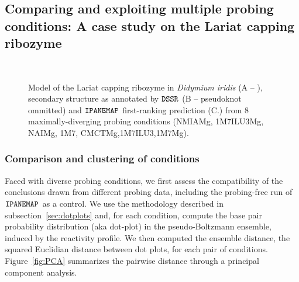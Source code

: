 \documentclass[a4,center,fleqn]{NAR}
\newcommand{\Software}[1]{$\text{\ttfamily #1}$}
\newcommand{\OurTool}{\Software{IPANEMAP}\xspace}
\begin{document}


\subsection{Comparing and exploiting multiple probing conditions: A case study on the Lariat capping ribozyme}

\begin{figure}
	{\\}
	
	\caption{Model of the Lariat capping ribozyme in {\itshape Didymium iridis} (A -- \citet{Meyer2014}), secondary structure as annotated by \Software{DSSR} (B -- pseudoknot ommitted) and \OurTool first-ranking prediction (C.) from 8 maximally-diverging probing conditions (NMIAMg, 1M7ILU3Mg, NAIMg, 1M7, CMCTMg,1M7ILU3,1M7Mg). }
\end{figure}



\subsubsection{Comparison and clustering of conditions}
Faced with diverse probing conditions, we first assess the compatibility of the conclusions drawn from different probing data, including the probing-free run of \OurTool as a control. We use the methodology described in subsection~\ref{sec:dotplots} and, for each condition, compute the base pair probability distribution (aka dot-plot) in the  pseudo-Boltzmann ensemble, induced by the reactivity profile. We then computed the ensemble distance, the squared Euclidian distance between dot plots, for each pair of conditions. Figure~\ref{fig:PCA} summarizes the pairwise distance through a principal component analysis.
\end{document}

